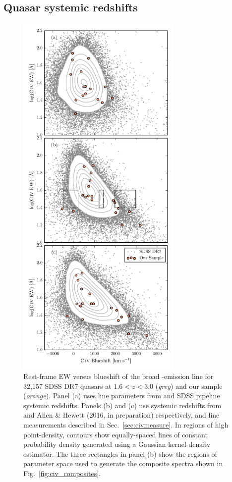 \subsection{Quasar systemic redshifts}
\label{sub:sysredshifts}

\begin{figure}
    \includegraphics[width=8cm]{figures/chapter02/civ_space.pdf}
    \caption{Rest-frame EW versus blueshift of the broad -emission line for 32,157 SDSS DR7 quasars at $1.6 < z < 3.0$ ({\it grey}) and our sample ({\it orange}). Panel (a) uses  line parameters from \citet{shen11} and SDSS pipeline systemic redshifts. Panels (b) and (c) use systemic redshifts from \citet{hewett10} and Allen \& Hewett (2016, in preparation) respectively, and  line measurements described in Sec.~\ref{sec:civmeasure}. In regions of high point-density, contours show equally-spaced lines of constant probability density generated using a Gaussian kernel-density estimator. The three rectangles in panel (b) show the regions of parameter space used to generate the composite spectra shown in Fig.~\ref{fig:civ_composites}. } 
    \label{fig:civ_space}
\end{figure}

